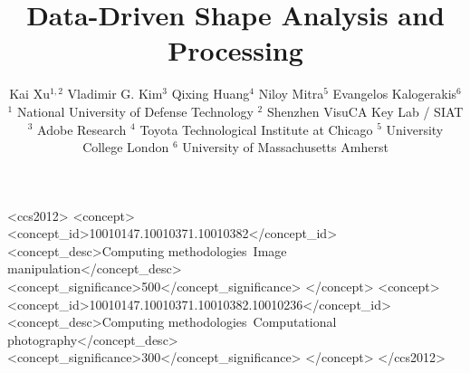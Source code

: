 \documentclass{acmsiggraph}
\title{Data-Driven Shape Analysis and Processing}
\author{
Kai Xu$^{1,2}$
        \quad Vladimir G. Kim$^{3}$
        \quad Qixing Huang$^{4}$
        \quad Niloy Mitra$^{5}$
        \quad Evangelos Kalogerakis$^{6}$        
        \\ 
         $^1$ National University of Defense Technology \quad
         $^2$ Shenzhen VisuCA Key Lab / SIAT \quad
         $^3$ Adobe Research \quad
         $^4$ Toyota Technological Institute at Chicago \quad
         $^5$ University College London \quad
         $^6$ University of Massachusetts Amherst
         }
\begin{document}


\let\rm=\rmfamily    \let\sf=\sffamily    \let\tt=\ttfamily
\let\it=\itshape     \let\sl=\slshape     \let\sc=\scshape
\let\bf=\bfseries
\let\vec=\mathbf
\let\mat=\mathbf
\let\set=\mathcal
\newcommand{\para}[1]{\noindent{\bf #1}}


\def\rev#1{\textcolor{black}{#1}}

\def\fix#1{\textcolor{black}{#1}}


\maketitle

\begin{abstract}



\end{abstract}

%
%
\begin{CCSXML}
<ccs2012>
<concept>
<concept_id>10010147.10010371.10010382</concept_id>
<concept_desc>Computing methodologies~Image manipulation</concept_desc>
<concept_significance>500</concept_significance>
</concept>
<concept>
<concept_id>10010147.10010371.10010382.10010236</concept_id>
<concept_desc>Computing methodologies~Computational photography</concept_desc>
<concept_significance>300</concept_significance>
</concept>
</ccs2012>
\end{CCSXML}


%
%


\keywordlist
\end{document}
